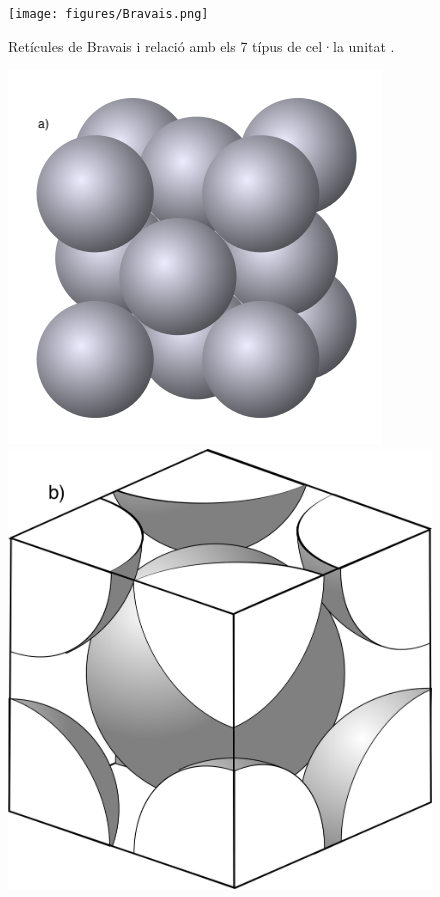\begin{figure}[h]
\centering
\texttt{[image: figures/Bravais.png]}
\caption{Retícules de Bravais i relació amb els 7 típus de cel·la unitat \cite{yen_chemistry_2008}.}
\label{fig:Bravais}
\end{figure}
\begin{figure}[h]
\centering
\includegraphics[scale=0.4]{figures/FCC_crystal_structure.png}
\includegraphics[scale=0.12]{figures/CBC_crystal_structure.png}

\end{figure}

